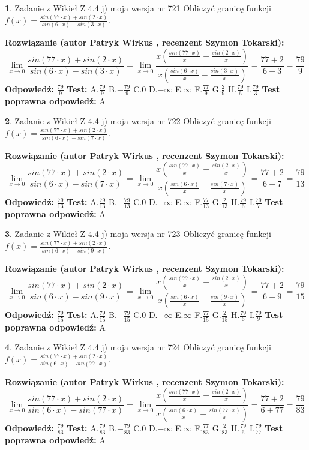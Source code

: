 \documentclass[12pt, a4paper]{article}
\theoremstyle{definition} %
\newtheorem{zad}{}
\newcommand{\zadStart}[1]{\begin{zad}#1\newline}
\newcommand{\zadStop}{\end{zad}}
\newcommand{\rozwStart}[2]{\noindent \textbf{Rozwiązanie (autor #1 , recenzent #2): }\newline}
\newcommand{\rozwStop}{\newline}
\newcommand{\odpStart}{\noindent \textbf{Odpowiedź:}\newline}
\newcommand{\odpStop}{\newline}
\newcommand{\testStart}{\noindent \textbf{Test:}\newline}
\newcommand{\testStop}{\newline}
\newcommand{\kluczStart}{\noindent \textbf{Test poprawna odpowiedź:}\newline}
\newcommand{\kluczStop}{\newline}
\begin{document}
\zadStart{Zadanie z Wikieł Z 4.4 j) moja wersja nr 721}
Obliczyć granicę funkcji $f(x)=\frac{sin(77\cdot x) +sin(2\cdot x)}{sin(6\cdot x) -sin(3\cdot x)}$.
\zadStop
\rozwStart{Patryk Wirkus}{Szymon Tokarski}
$$\lim\limits_{x\to 0}\frac{sin(77\cdot x) +sin(2\cdot x)}{sin(6\cdot x) -sin(3\cdot x)}=\lim\limits_{x\to 0}\frac{x(\frac{sin(77\cdot x)}{x}+\frac{sin(2\cdot x)}{x})}{x(\frac{sin(6\cdot x)}{x}-\frac{sin(3\cdot x)}{x})}=\frac{77+2}{6+3} = \frac{79}{9}$$
\rozwStop
\odpStart
$\frac{79}{9}$
\odpStop
\testStart
A.$\frac{79}{9}$
B.$-\frac{79}{9}$
C.$0$
D.$-\infty$
E.$\infty$
F.$\frac{77}{9}$
G.$\frac{2}{9}$
H.$\frac{79}{6}$
I.$\frac{79}{3}$
\testStop
\kluczStart
A
\kluczStop



\zadStart{Zadanie z Wikieł Z 4.4 j) moja wersja nr 722}
Obliczyć granicę funkcji $f(x)=\frac{sin(77\cdot x) +sin(2\cdot x)}{sin(6\cdot x) -sin(7\cdot x)}$.
\zadStop
\rozwStart{Patryk Wirkus}{Szymon Tokarski}
$$\lim\limits_{x\to 0}\frac{sin(77\cdot x) +sin(2\cdot x)}{sin(6\cdot x) -sin(7\cdot x)}=\lim\limits_{x\to 0}\frac{x(\frac{sin(77\cdot x)}{x}+\frac{sin(2\cdot x)}{x})}{x(\frac{sin(6\cdot x)}{x}-\frac{sin(7\cdot x)}{x})}=\frac{77+2}{6+7} = \frac{79}{13}$$
\rozwStop
\odpStart
$\frac{79}{13}$
\odpStop
\testStart
A.$\frac{79}{13}$
B.$-\frac{79}{13}$
C.$0$
D.$-\infty$
E.$\infty$
F.$\frac{77}{13}$
G.$\frac{2}{13}$
H.$\frac{79}{6}$
I.$\frac{79}{7}$
\testStop
\kluczStart
A
\kluczStop



\zadStart{Zadanie z Wikieł Z 4.4 j) moja wersja nr 723}
Obliczyć granicę funkcji $f(x)=\frac{sin(77\cdot x) +sin(2\cdot x)}{sin(6\cdot x) -sin(9\cdot x)}$.
\zadStop
\rozwStart{Patryk Wirkus}{Szymon Tokarski}
$$\lim\limits_{x\to 0}\frac{sin(77\cdot x) +sin(2\cdot x)}{sin(6\cdot x) -sin(9\cdot x)}=\lim\limits_{x\to 0}\frac{x(\frac{sin(77\cdot x)}{x}+\frac{sin(2\cdot x)}{x})}{x(\frac{sin(6\cdot x)}{x}-\frac{sin(9\cdot x)}{x})}=\frac{77+2}{6+9} = \frac{79}{15}$$
\rozwStop
\odpStart
$\frac{79}{15}$
\odpStop
\testStart
A.$\frac{79}{15}$
B.$-\frac{79}{15}$
C.$0$
D.$-\infty$
E.$\infty$
F.$\frac{77}{15}$
G.$\frac{2}{15}$
H.$\frac{79}{6}$
I.$\frac{79}{9}$
\testStop
\kluczStart
A
\kluczStop



\zadStart{Zadanie z Wikieł Z 4.4 j) moja wersja nr 724}
Obliczyć granicę funkcji $f(x)=\frac{sin(77\cdot x) +sin(2\cdot x)}{sin(6\cdot x) -sin(77\cdot x)}$.
\zadStop
\rozwStart{Patryk Wirkus}{Szymon Tokarski}
$$\lim\limits_{x\to 0}\frac{sin(77\cdot x) +sin(2\cdot x)}{sin(6\cdot x) -sin(77\cdot x)}=\lim\limits_{x\to 0}\frac{x(\frac{sin(77\cdot x)}{x}+\frac{sin(2\cdot x)}{x})}{x(\frac{sin(6\cdot x)}{x}-\frac{sin(77\cdot x)}{x})}=\frac{77+2}{6+77} = \frac{79}{83}$$
\rozwStop
\odpStart
$\frac{79}{83}$
\odpStop
\testStart
A.$\frac{79}{83}$
B.$-\frac{79}{83}$
C.$0$
D.$-\infty$
E.$\infty$
F.$\frac{77}{83}$
G.$\frac{2}{83}$
H.$\frac{79}{6}$
I.$\frac{79}{77}$
\testStop
\kluczStart
A
\kluczStop
\end{document}
